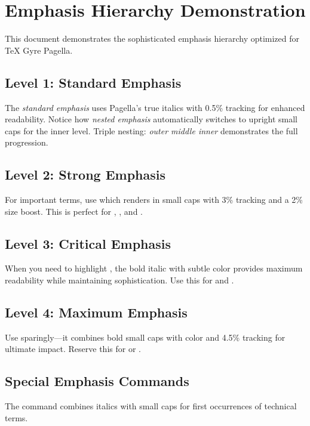 \documentclass{article}
\begin{document}
\section{Emphasis Hierarchy Demonstration}

This document demonstrates the sophisticated emphasis hierarchy optimized for TeX Gyre Pagella.

\subsection{Level 1: Standard Emphasis}
The \emph{standard emphasis} uses Pagella's true italics with 0.5\% tracking for enhanced readability. 
Notice how \emph{nested \emph{emphasis}} automatically switches to upright small caps for the inner level.
Triple nesting: \emph{outer \emph{middle \emph{inner}}} demonstrates the full progression.

\subsection{Level 2: Strong Emphasis}  
For important terms, use  which renders in small caps with 3\% tracking and a 2\% size boost. 
This is perfect for , , and .

\subsection{Level 3: Critical Emphasis}
When you need to highlight , the bold italic with subtle color provides maximum readability while maintaining sophistication. 
Use this for  and .

\subsection{Level 4: Maximum Emphasis}
Use  sparingly---it combines bold small caps with color and 4.5\% tracking for ultimate impact.
Reserve this for  or .

\subsection{Special Emphasis Commands}

The  command combines italics with small caps for first occurrences of technical terms.
\end{document}
